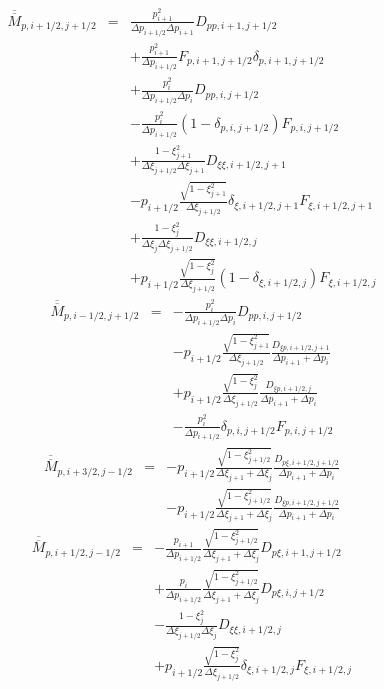 \begin{eqnarray*}
\overline{\overline{M}}_{p,i+1/2,j+1/2} & = & \frac{p_{i+1}^{2}}{\Delta p_{i+1/2}\Delta p_{i+1}}D_{pp,i+1,j+1/2}\\
 &  & +\frac{p_{i+1}^{2}}{\Delta p_{i+1/2}}F_{p,i+1,j+1/2}\delta_{p,i+1,j+1/2}\\
 &  & +\frac{p_{i}^{2}}{\Delta p_{i+1/2}\Delta p_{i}}D_{pp,i,j+1/2}\\
 &  & -\frac{p_{i}^{2}}{\Delta p_{i+1/2}}\left(1-\delta_{p,i,j+1/2}\right)F_{p,i,j+1/2}\\
 &  & +\frac{1-\xi_{j+1}^{2}}{\Delta\xi_{j+1/2}\Delta\xi_{j+1}}D_{\xi\xi,i+1/2,j+1}\\
 &  & -p_{i+1/2}\frac{\sqrt{1-\xi_{j+1}^{2}}}{\Delta\xi_{j+1/2}}\delta_{\xi,i+1/2,j+1}F_{\xi,i+1/2,j+1}\\
 &  & +\frac{1-\xi_{j}^{2}}{\Delta\xi_{j}\Delta\xi_{j+1/2}}D_{\xi\xi,i+1/2,j}\\
 &  & +p_{i+1/2}\frac{\sqrt{1-\xi_{j}^{2}}}{\Delta\xi_{j+1/2}}\left(1-\delta_{\xi,i+1/2,j}\right)F_{\xi,i+1/2,j}\end{eqnarray*}
\begin{eqnarray*}
\overline{\overline{M}}_{p,i-1/2,j+1/2} & = & -\frac{p_{i}^{2}}{\Delta p_{i+1/2}\Delta p_{i}}D_{pp,i,j+1/2}\\
 &  & -p_{i+1/2}\frac{\sqrt{1-\xi_{j+1}^{2}}}{\Delta\xi_{j+1/2}}\frac{D_{\xi p,i+1/2,j+1}}{\Delta p_{i+1}+\Delta p_{i}}\\
 &  & +p_{i+1/2}\frac{\sqrt{1-\xi_{j}^{2}}}{\Delta\xi_{j+1/2}}\frac{D_{\xi p,i+1/2,j}}{\Delta p_{i+1}+\Delta p_{i}}\\
 &  & -\frac{p_{i}^{2}}{\Delta p_{i+1/2}}\delta_{p,i,j+1/2}F_{p,i,j+1/2}\end{eqnarray*}
\begin{eqnarray*}
\overline{\overline{M}}_{p,i+3/2,j-1/2} & = & -p_{i+1/2}\frac{\sqrt{1-\xi_{j+1/2}^{2}}}{\Delta\xi_{j+1}+\Delta\xi_{j}}\frac{D_{p\xi,i+1/2,j+1/2}}{\Delta p_{i+1}+\Delta p_{i}}\\
 &  & -p_{i+1/2}\frac{\sqrt{1-\xi_{j+1/2}^{2}}}{\Delta\xi_{j+1}+\Delta\xi_{j}}\frac{D_{\xi p,i+1/2,j+1/2}}{\Delta p_{i+1}+\Delta p_{i}}\end{eqnarray*}
\begin{eqnarray*}
\overline{\overline{M}}_{p,i+1/2,j-1/2} & = & -\frac{p_{i+1}}{\Delta p_{i+1/2}}\frac{\sqrt{1-\xi_{j+1/2}^{2}}}{\Delta\xi_{j+1}+\Delta\xi_{j}}D_{p\xi,i+1,j+1/2}\\
 &  & +\frac{p_{i}}{\Delta p_{i+1/2}}\frac{\sqrt{1-\xi_{j+1/2}^{2}}}{\Delta\xi_{j+1}+\Delta\xi_{j}}D_{p\xi,i,j+1/2}\\
 &  & -\frac{1-\xi_{j}^{2}}{\Delta\xi_{j+1/2}\Delta\xi_{j}}D_{\xi\xi,i+1/2,j}\\
 &  & +p_{i+1/2}\frac{\sqrt{1-\xi_{j}^{2}}}{\Delta\xi_{j+1/2}}\delta_{\xi,i+1/2,j}F_{\xi,i+1/2,j}\end{eqnarray*}
